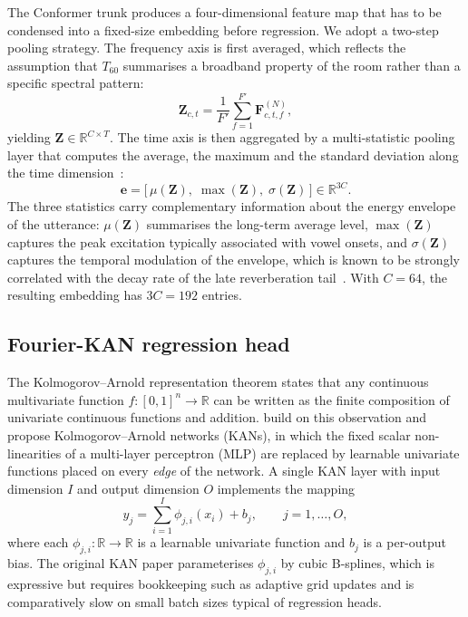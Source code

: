 \documentclass[a4paper,fleqn]{cas-sc}
\begin{document}
The Conformer trunk produces a four-dimensional feature map that has to
be condensed into a fixed-size embedding before regression. We adopt a
two-step pooling strategy. The frequency axis is first averaged, which
reflects the assumption that $T_{60}$ summarises a broadband property of
the room rather than a specific spectral pattern:
\begin{equation}\label{eq:freq_avg}
  \mathbf{Z}_{c,t} = \frac{1}{F'}\sum_{f=1}^{F'}\mathbf{F}^{(N)}_{c,t,f},
\end{equation}
yielding $\mathbf{Z}\in\mathbb{R}^{C\times T}$. The time axis is then
aggregated by a multi-statistic pooling layer that computes the average,
the maximum and the standard deviation along the time
dimension~\citep{snyder2018xvector}:
\begin{equation}\label{eq:multipool}
  \mathbf{e} = \bigl[\,\mu(\mathbf{Z}),\;
   \max(\mathbf{Z}),\;\sigma(\mathbf{Z})\,\bigr] \in \mathbb{R}^{3C}.
\end{equation}
The three statistics carry complementary information about the energy
envelope of the utterance: $\mu(\mathbf{Z})$ summarises the long-term
average level, $\max(\mathbf{Z})$ captures the peak excitation typically
associated with vowel onsets, and $\sigma(\mathbf{Z})$ captures the
temporal modulation of the envelope, which is known to be strongly
correlated with the decay rate of the late reverberation
tail~\citep{falk2010temporal}. With $C=64$, the resulting embedding has
$3C=192$ entries.

\subsection{Fourier-KAN regression head}\label{sec:method:head}

The Kolmogorov--Arnold representation theorem states that any
continuous multivariate function $f:[0,1]^{n}\to\mathbb{R}$ can be
written as the finite composition of univariate continuous functions
and addition. \citet{liu2024kan} build on this observation and propose
Kolmogorov--Arnold networks (KANs), in which the fixed scalar
non-linearities of a multi-layer perceptron (MLP) are replaced by
learnable univariate functions placed on every \emph{edge} of the
network. A single KAN layer with input dimension $I$ and output
dimension $O$ implements the mapping
\begin{equation}\label{eq:kan_layer}
  y_j = \sum_{i=1}^{I} \phi_{j,i}(x_i) + b_j,
  \qquad j=1,\ldots,O,
\end{equation}
where each $\phi_{j,i}:\mathbb{R}\to\mathbb{R}$ is a learnable univariate
function and $b_j$ is a per-output bias. The original KAN paper
parameterises $\phi_{j,i}$ by cubic B-splines, which is expressive but
requires bookkeeping such as adaptive grid updates and is comparatively
slow on small batch sizes typical of regression heads.
\end{document}
